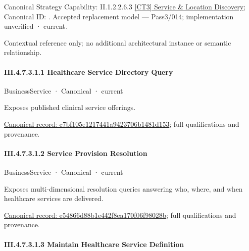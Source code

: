 {\small Canonical Strategy Capability: II.1.2.2.6.3 \hyperref[element:8c313972197c48369767dec1a745d7fc]{[CT3] Service \& Location Discovery}; Canonical ID: \texttt{}. Accepted replacement model — Pass3/014; implementation unverified · current.}\par
Contextual reference only; no additional architectural instance or semantic relationship.\par
\paragraph*{III.4.7.3.1.1 Healthcare Service Directory Query}
\label{navigation:III.4.7.3.1.1}

\label{element:c7bf105e1217441a9423706b1481d153}
{\small BusinessService · Canonical · current}\par

Exposes published clinical service offerings.


{\footnotesize \href{../../../../../../../../continuum/business/business-service/c7bf105e1217441a9423706b1481d153.md}{Canonical record: c7bf105e1217441a9423706b1481d153}; full qualifications and provenance.}\par
\paragraph*{III.4.7.3.1.2 Service Provision Resolution}
\label{navigation:III.4.7.3.1.2}

\label{element:e54866d88b1e442f8ea170f06f98028b}
{\small BusinessService · Canonical · current}\par

Exposes multi-dimensional resolution queries answering who, where, and when healthcare services are delivered.


{\footnotesize \href{../../../../../../../../continuum/business/business-service/e54866d88b1e442f8ea170f06f98028b.md}{Canonical record: e54866d88b1e442f8ea170f06f98028b}; full qualifications and provenance.}\par
\paragraph*{III.4.7.3.1.3 Maintain Healthcare Service Definition}
\label{navigation:III.4.7.3.1.3}

